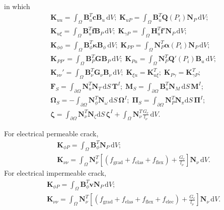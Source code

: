 \documentclass[times,fleqn,11pt]{elsarticle}
\begin{document}
in which 
\begin{equation}
    \begin{split}
        & \mathbf{K}_{uu}=\int_\Omega \mathbf{B}_u^T{\mathbf{c}}\mathbf{B}_u\,\mathrm{d}V;\;  
        \mathbf{K}_{uP}=\int_\Omega \mathbf{B}_u^T{\mathbf{Q}(P_i)}\mathbf{N}_P\,\mathrm{d}V; \; \\
        & \mathbf{K}_{u\xi}=\int_\Omega \mathbf{B}_u^T{\mathbf{f}}\mathbf{B}_P\,\mathrm{d}V;\;
        \mathbf{K}_{\gamma P}=\int_\Omega \mathbf{H}_u^T{\mathbf{f'}}\mathbf{N}_P\,\mathrm{d}V; \\
        &\mathbf{K}_{\phi\phi}=\int_\Omega \mathbf{B}_\phi^T{\mathbf{\kappa}}\mathbf{B}_\phi\,\mathrm{d}V; \;
        \mathbf{K}_{PP}=\int_\Omega \mathbf{N}_P^T\mathbf{\alpha}(P_i)\mathbf{N}_P\,\mathrm{d}V; \; \\
        &\mathbf{K}_{PP'}=\int_\Omega \mathbf{B}_P^T{\mathbf{G}}\mathbf{B}_P\,\mathrm{d}V; \; \mathbf{K}_{Pu}=\int_\Omega \mathbf{N}_P^T{\mathbf{Q}'(P_i)}\mathbf{B}_u\, \mathrm{d}V; \\
        &\mathbf{K}_{\nu\nu}'=\int_\Omega \mathbf{B}_\nu^T \mathbf{G}_\nu \mathbf{B}_\nu\, \text{d}V; \;
        \mathbf{K}_{\xi u}=\mathbf{K}_{u\xi}^T;\;
        \mathbf{K}_{P\gamma}=\mathbf{K}_{\gamma P}^T;\; 
         \\
        &\mathbf{F}_S=\int_{\partial \Omega} \mathbf{N}_u^T\mathbf{N}_T\,\mathrm{d}S \, \mathbf{T}^I; \;
        \mathbf{M}_S=\int_{\partial \Omega} \mathbf{B}_u^T\mathbf{N}_M\,\mathrm{d}S \, \mathbf{M}^I; \\
        & \mathbf{\Omega}_S=-\int_{\partial \Omega} \mathbf{N}_\phi^T\mathbf{N}_\omega\,\mathrm{d}S \, \mathbf{\Omega}^I;\; 
        \mathbf{\Pi}_S=\int_{\partial \Omega} \mathbf{N}_P^T\mathbf{N}_\pi \mathrm{d}S \,\mathbf{\Pi}^I; \\
        &\mathbf{\zeta}=\int_{\partial \Omega} \mathbf{N}_\nu^T \mathbf{N}_\zeta\mathrm{d}S\, \mathbf{\zeta}^I+\int_\Omega \mathbf{N}_\nu^T\frac{G_c}{l_\nu}\,\text{d}V.
    \end{split}
\end{equation}

For electrical permeable crack,
\begin{equation}
    \begin{split}
        & \mathbf{K}_{\phi P}=\int_\Omega \mathbf{B}_\phi^T\mathbf{N}_P\,\mathrm{d}V; \\
        &\mathbf{K}_{\nu\nu}=\int_\Omega \mathbf{N}_\nu^T \left[(f_\mathrm{grad}+f_\mathrm{elas}+f_\mathrm{flex})+\frac{G_c}{l_\nu}\right]\mathbf{N}_\nu \,\mathrm{d}V.
    \end{split}
\end{equation}
For electrical impermeable crack, 
\begin{equation}
    \begin{split}
        &\mathbf{K}_{\phi P}=\int_\Omega \mathbf{B}_\phi^T{\mathbf{v}}\mathbf{N}_P\,\mathrm{d}V; \\
        &\mathbf{K}_{\nu\nu}=\int_\Omega \mathbf{N}_\nu^T \left[(f_\mathrm{grad}+f_\mathrm{elas}+f_\mathrm{flex}+f_\mathrm{elec})+\frac{G_c}{l_\nu}\right]\mathbf{N}_\nu \,\mathrm{d}V .
    \end{split}
\end{equation}
\end{document}
